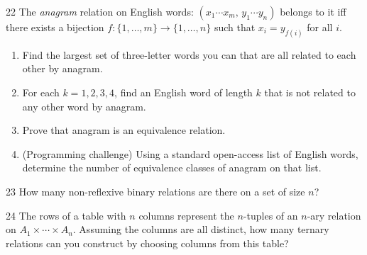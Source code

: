 \begin{exercise}{22}
    The \emph{anagram} relation on English words: $(x_1\cdots x_m,\,y_1\cdots
    y_n)$ belongs to it iff there exists a bijection
    $f:\{1,\dots,m\}\to\{1,\dots,n\}$ such that $x_i=y_{f(i)}$ for all $i$.
    \begin{enumerate}[label=(\alph*)]
        \item Find the largest set of three-letter words you can that are all
              related to each other by anagram.
        \item For each $k=1,2,3,4$, find an English word of length $k$ that is
              not related to any other word by anagram.
        \item Prove that anagram is an equivalence relation.
        \item (Programming challenge) Using a standard open-access list of
              English words, determine the number of equivalence classes of
              anagram on that list.
    \end{enumerate}
\end{exercise}
\begin{solbox}
\begin{solution}[(a)]

\end{solution}
\begin{solution}[(b)]

\end{solution}
\begin{solution}[(c)]

\end{solution}
\end{solbox}

\begin{exercise}{23}
    How many non-reflexive binary relations are there on a set of size $n$?
\end{exercise}

\begin{exercise}{24}
    The rows of a table with $n$ columns represent the $n$-tuples of an $n$-ary
    relation on $A_1\times\cdots\times A_n$. Assuming the columns are all
    distinct, how many ternary relations can you construct by choosing columns
    from this table?
\end{exercise}
\begin{solbox}
\begin{solution}

\end{solution}
\end{solbox}

